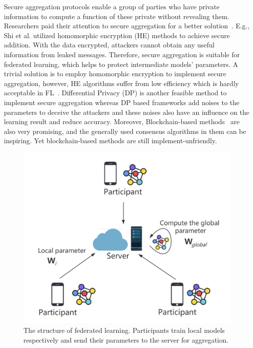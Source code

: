 Secure aggregation protocols enable a group of parties who have private information to compute a function of these private without revealing them. Researchers paid their attention to secure aggregation for a better solution~\cite{shi2011privacy,RobustAgg,Bonawitz19,Nike,PrivFL}. E.g., Shi et al.\cite{shi2011privacy} utilized homomorphic encryption (HE) methods to achieve secure addition. With the data encrypted, attackers cannot obtain any useful information from leaked messages. Therefore, secure aggregation is suitable for federated learning, which helps to protect intermediate models' parameters. A trivial solution is to employ homomorphic encryption to implement secure aggregation, however, HE algorithms suffer from low efficiency which is hardly acceptable in FL~\cite{HESurvey}. Differential Privacy (DP) is another feasible method to implement secure aggregation whereas DP based frameworks add noises to the parameters to deceive the attackers and these noises also have an influence on the learning result and reduce accuracy. Moreover, Blockchain-based methods~\cite{DeepChain,Lu2020,On-Device} are also very promising, and the generally used consensus algorithms in them can be inspiring. Yet blockchain-based methods are still implement-unfriendly. 

\begin{figure}[!ht]
    \centering
    \includegraphics[width=\columnwidth]{img/fed.png}
    \caption{The structure of federated learning. Participants train local models respectively and send their parameters to the server for aggregation.}
    \label{fed}
\end{figure}

